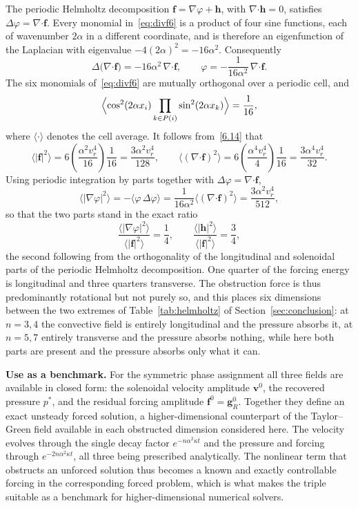 \documentclass[11pt]{jfm}
\providecommand\bcdot{\boldsymbol{\cdot}}
\numberwithin{equation}{section}
\begin{document}
The periodic Helmholtz decomposition
$\boldsymbol{f}=\nabla\varphi+\boldsymbol{h}$, with $\nabla\bcdot\boldsymbol{h}=0$, satisfies
$\Delta\varphi=\nabla\bcdot\boldsymbol{f}$. Every monomial in~\eqref{eq:divf6} is a product of four
sine functions, each of wavenumber $2\alpha$ in a different coordinate, and is therefore an
eigenfunction of the Laplacian with eigenvalue $-4(2\alpha)^2=-16\alpha^2$. Consequently
\[
\Delta\bigl(\nabla\bcdot\boldsymbol{f}\bigr)=-16\alpha^2\,\nabla\bcdot\boldsymbol{f},
\qquad
\varphi=-\frac{1}{16\alpha^2}\,\nabla\bcdot\boldsymbol{f}.
\]
The six monomials of~\eqref{eq:divf6} are mutually orthogonal over a periodic cell, and
\[
\Bigl\langle\cos^2(2\alpha x_i)\prod_{k\in P(i)}\sin^2(2\alpha x_k)\Bigr\rangle=\frac1{16},
\]
where $\langle\cdot\rangle$ denotes the cell average. It follows from~\eqref{6.14} that
\[
\bigl\langle|\boldsymbol{f}|^2\bigr\rangle
=6\left(\frac{\alpha^2v_r^4}{16}\right)\frac1{16}=\frac{3\alpha^2v_r^4}{128},
\qquad
\bigl\langle(\nabla\bcdot\boldsymbol{f})^2\bigr\rangle
=6\left(\frac{\alpha^4v_r^4}{4}\right)\frac1{16}=\frac{3\alpha^4v_r^4}{32}.
\]
Using periodic integration by parts together with
$\Delta\varphi=\nabla\bcdot\boldsymbol{f}$,
\[
\bigl\langle|\nabla\varphi|^2\bigr\rangle
=-\bigl\langle\varphi\,\Delta\varphi\bigr\rangle
=\frac{1}{16\alpha^2}\bigl\langle(\nabla\bcdot\boldsymbol{f})^2\bigr\rangle
=\frac{3\alpha^2v_r^4}{512},
\]
so that the two parts stand in the exact ratio
\begin{equation}
\label{eq:helm6}
\frac{\langle|\nabla\varphi|^2\rangle}{\langle|\boldsymbol{f}|^2\rangle}=\frac14,
\qquad
\frac{\langle|\boldsymbol{h}|^2\rangle}{\langle|\boldsymbol{f}|^2\rangle}=\frac34 ,
\end{equation}
the second following from the orthogonality of the longitudinal and solenoidal parts of the
periodic Helmholtz decomposition.
One quarter of the forcing energy is longitudinal and three quarters transverse. The obstruction
force is thus predominantly rotational but not purely so, and this places six dimensions between
the two extremes of Table~\ref{tab:helmholtz} of Section~\ref{sec:conclusion}: at $n=3,4$ the convective field is entirely
longitudinal and the pressure absorbs it, at $n=5,7$ entirely transverse and the pressure absorbs
nothing, while here both parts are present and the pressure absorbs only what it can.

\medskip
\noindent\textbf{Use as a benchmark.} For the symmetric phase assignment all three fields are
available in closed form: the solenoidal velocity amplitude $\boldsymbol{v}^0$, the recovered
pressure $p^{*}$, and the residual forcing amplitude
$\boldsymbol{f}^0=\boldsymbol{g}^{0}_{R}$. Together they define an exact unsteady forced solution,
a higher-dimensional counterpart of the Taylor--Green field available in each obstructed dimension
considered here. The velocity evolves through the single decay factor $e^{-n\alpha^2\kappa t}$ and
the pressure and forcing through $e^{-2n\alpha^2\kappa t}$, all three being prescribed
analytically. The nonlinear term that obstructs an unforced solution thus becomes a known and
exactly controllable forcing in the corresponding forced problem, which is what makes the triple
suitable as a benchmark for higher-dimensional numerical solvers.
\end{document}
